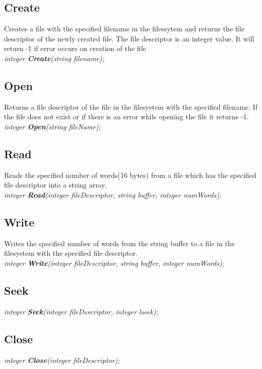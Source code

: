 \documentclass[11pt]{article}
\begin{document}
\subsection{Create}
Creates a file with the specified filename in the filessytem and returns the file descriptor of the newly created file. The file descriptor is an integer value. It will return -1 if error occurs on creation of the file\\

\textit{integer \textbf{Create}(string filename);}

\subsection{Open}
Returns a file descriptor of the file in the filesystem with the specified filename. If the file does not exist or if there is an error while opening the file it returns -1.\\

\textit{integer \textbf{Open}(string fileName);}

\subsection{Read}
Reads the specified number of words(16 bytes) from a file which has the specified file descriptor into a string array. \\

\textit{integer \textbf{Read}(integer fileDescriptor, string buffer, integer numWords);}


\subsection{Write}
Writes the specified number of words from the string buffer to a file in the filesystem with the specified file descriptor.\\

\textit{integer \textbf{Write}(integer fileDescriptor, string buffer, integer numWords);}

\subsection{Seek}
\textit{integer \textbf{Seek}(integer fileDescriptor, integer lseek);}
 
 \subsection{Close}
\textit{integer \textbf{Close}(integer fileDescriptor);}
\end{document}
